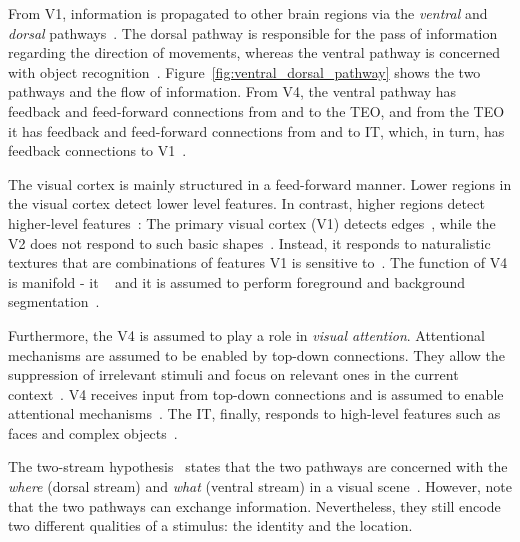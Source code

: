 From \ac{V1}, information is propagated to other brain regions via the \textit{ventral} and \textit{dorsal} pathways~\citep[pp. 563, 563]{mack2013principles}.
The dorsal pathway is responsible for the pass of information regarding the direction of movements, whereas the ventral pathway is concerned with object recognition~\citep[p. 564]{mack2013principles}.
Figure~\ref{fig:ventral_dorsal_pathway} shows the two pathways and the flow of information.
From V4, the ventral pathway has feedback and feed-forward connections from and to the \ac{TEO}, and from the \ac{TEO} it has feedback and feed-forward connections from and to \acf{IT}, which, in turn, has feedback connections to \ac{V1}~\citep[p. 563]{mack2013principles}.

The visual cortex is mainly structured in a feed-forward manner.
Lower regions in the visual cortex detect lower level features.
In contrast, higher regions detect higher-level features~\citep{eickenberg2017seeing,desimone1995neural}:
The primary visual cortex (\ac{V1}) detects edges~\citep{hubel1962receptive, eickenberg2017seeing}, while the \ac{V2} does not respond to such basic shapes~\citep{freeman2013functional}.
Instead, it responds to naturalistic textures that are combinations of features \ac{V1} is sensitive to~\citep{freeman2013functional}.
The function of V4 is manifold - it ~\citep{eickenberg2017seeing} and it is assumed to perform foreground and background segmentation~\citep{roe2012toward}.

Furthermore, the \ac{V4} is assumed to play a role in \textit{visual attention}.
Attentional mechanisms are assumed to be enabled by top-down connections.
They allow the suppression of irrelevant stimuli and focus on relevant ones in the current context~\citep{desimone1995neural,roe2012toward}.
\ac{V4} receives input from top-down connections and is assumed to enable attentional mechanisms~\citep{roe2012toward}.
The \ac{IT}, finally, responds to high-level features such as faces and complex objects~\citep{logothetis1995shape, eickenberg2017seeing}.

The two-stream hypothesis~\citep{goodale1992separate} states that the two pathways are concerned with the \textit{where} (dorsal stream) and \textit{what} (ventral stream) in a visual scene~\citep[p. 520]{mack2013principles}.
However, \citet[p. 564]{mack2013principles} note that the two pathways can exchange information.
Nevertheless, they still encode two different qualities of a stimulus: the identity and the location.

